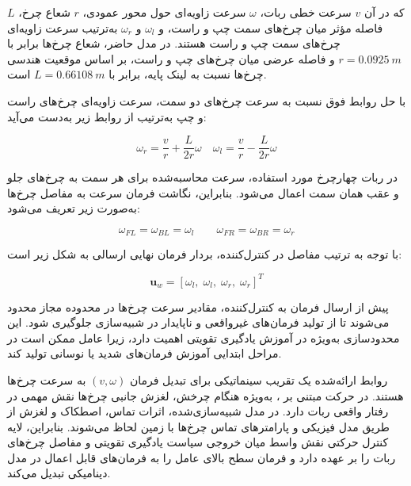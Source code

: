 که در آن \(v\) سرعت خطی ربات، \(\omega\) سرعت زاویه‌ای حول محور عمودی، \(r\) شعاع چرخ، \(L\) فاصله مؤثر میان چرخ‌های سمت چپ و راست، و \(\omega_l\) و \(\omega_r\) به‌ترتیب سرعت زاویه‌ای چرخ‌های سمت چپ و راست هستند. در مدل حاضر، شعاع چرخ‌ها برابر با \(r=0.0925~m\) و فاصله عرضی میان چرخ‌های چپ و راست، بر اساس موقعیت هندسی چرخ‌ها نسبت به لینک پایه، برابر با \(L=0.66108~m\) است.

با حل روابط فوق نسبت به سرعت چرخ‌های دو سمت، سرعت زاویه‌ای چرخ‌های راست و چپ به‌ترتیب از روابط زیر به‌دست می‌آید:

\begin{equation}
	\omega_r = \frac{v}{r} + \frac{L}{2r}\omega
	\quad
	\omega_l = \frac{v}{r} - \frac{L}{2r}\omega
	\label{eq:wheel_velocities}
\end{equation}

در ربات چهارچرخ مورد استفاده، سرعت محاسبه‌شده برای هر سمت به چرخ‌های جلو و عقب همان سمت اعمال می‌شود. بنابراین، نگاشت فرمان سرعت به مفاصل چرخ‌ها به‌صورت زیر تعریف می‌شود:

\begin{equation}
	\omega_{FL} = \omega_{BL} = \omega_l
	\qquad
	\omega_{FR} = \omega_{BR} = \omega_r
	\label{eq:four_wheel_velocity_mapping}
\end{equation}

با توجه به ترتیب مفاصل در کنترل‌کننده، بردار فرمان نهایی ارسالی به شکل زیر است:

\begin{equation}
	\mathbf{u}_{w} =
	\left[
	\omega_l,\;
	\omega_l,\;
	\omega_r,\;
	\omega_r
	\right]^T
	\label{eq:wheel_velocity_command_vector}
\end{equation}

پیش از ارسال فرمان به کنترل‌کننده، مقادیر سرعت چرخ‌ها در محدوده مجاز محدود می‌شوند تا از تولید فرمان‌های غیرواقعی و ناپایدار در شبیه‌سازی جلوگیری شود. این محدودسازی به‌ویژه در آموزش یادگیری تقویتی اهمیت دارد، زیرا عامل ممکن است در مراحل ابتدایی آموزش فرمان‌های شدید یا نوسانی تولید کند.

روابط ارائه‌شده یک تقریب سینماتیکی برای تبدیل فرمان \((v,\omega)\) به سرعت چرخ‌ها هستند. در حرکت مبتنی بر ، به‌ویژه هنگام چرخش، لغزش جانبی چرخ‌ها نقش مهمی در رفتار واقعی ربات دارد. در مدل شبیه‌سازی‌شده، اثرات تماس، اصطکاک و لغزش از طریق مدل فیزیکی  و پارامترهای تماس چرخ‌ها با زمین لحاظ می‌شوند. بنابراین، لایه کنترل حرکتی نقش واسط میان خروجی سیاست یادگیری تقویتی و مفاصل چرخ‌های ربات را بر عهده دارد و فرمان سطح بالای عامل را به فرمان‌های قابل اعمال در مدل دینامیکی تبدیل می‌کند.

